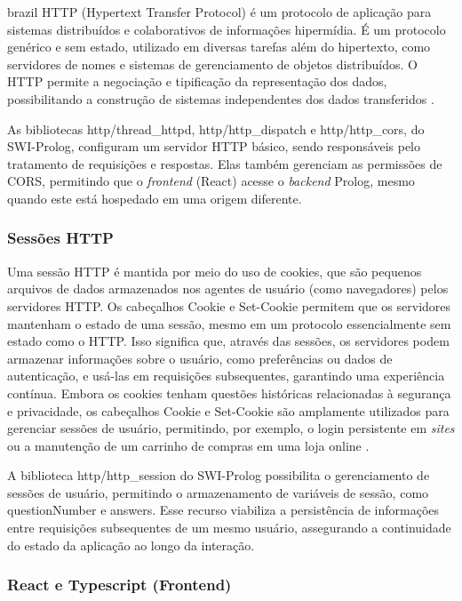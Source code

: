 \begin{otherlanguage*}{brazil}
HTTP (Hypertext Transfer Protocol) é um protocolo de aplicação para sistemas distribuídos e colaborativos de informações hipermídia. É um protocolo genérico e sem estado, utilizado em diversas tarefas além do hipertexto, como servidores de nomes e sistemas de gerenciamento de objetos distribuídos. O HTTP permite a negociação e tipificação da representação dos dados, possibilitando a construção de sistemas independentes dos dados transferidos \cite{whatishttp}.

As bibliotecas http/thread\_httpd, http/http\_dispatch e http/http\_cors, do SWI-Prolog, configuram um servidor HTTP básico, sendo responsáveis pelo tratamento de requisições e respostas. Elas também gerenciam as permissões de CORS, permitindo que o \textit{frontend} (React) acesse o \textit{backend} Prolog, mesmo quando este está hospedado em uma origem diferente.

\subsubsection{Sessões HTTP}

Uma sessão HTTP é mantida por meio do uso de cookies, que são pequenos arquivos de dados armazenados nos agentes de usuário (como navegadores) pelos servidores HTTP. Os cabeçalhos Cookie e Set-Cookie permitem que os servidores mantenham o estado de uma sessão, mesmo em um protocolo essencialmente sem estado como o HTTP. Isso significa que, através das sessões, os servidores podem armazenar informações sobre o usuário, como preferências ou dados de autenticação, e usá-las em requisições subsequentes, garantindo uma experiência contínua. Embora os cookies tenham questões históricas relacionadas à segurança e privacidade, os cabeçalhos Cookie e Set-Cookie são amplamente utilizados para gerenciar sessões de usuário, permitindo, por exemplo, o login persistente em \textit{sites} ou a manutenção de um carrinho de compras em uma loja online \cite{whatissession}.

A biblioteca http/http\_session do SWI-Prolog possibilita o gerenciamento de sessões de usuário, permitindo o armazenamento de variáveis de sessão, como questionNumber e answers. Esse recurso viabiliza a persistência de informações entre requisições subsequentes de um mesmo usuário, assegurando a continuidade do estado da aplicação ao longo da interação.

\subsubsection{React e Typescript (Frontend)}


\end{otherlanguage*}
